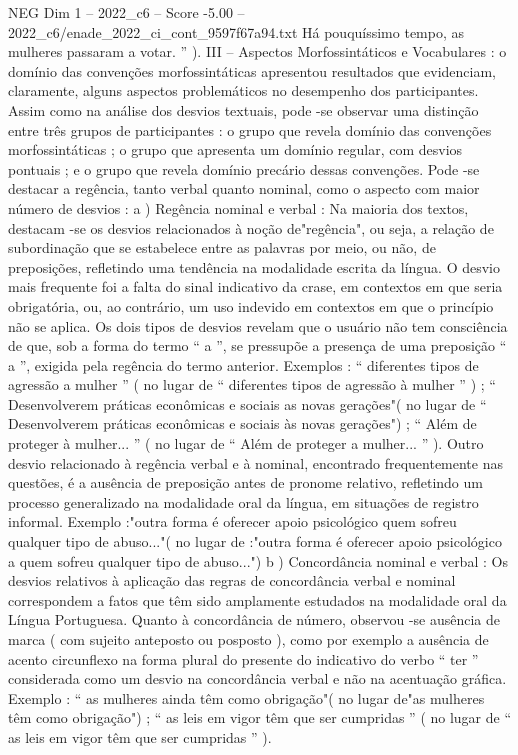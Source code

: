 \begin{textsample}{NEG Dim 1 – 2022\_c6 – Score -5.00 – 2022\_c6/enade\_2022\_ci\_cont\_9597f67a94.txt}
Há pouquíssimo tempo, as mulheres passaram a votar. ” ).
III – Aspectos Morfossintáticos e Vocabulares : o domínio das convenções morfossintáticas apresentou resultados que evidenciam, claramente, alguns aspectos problemáticos no desempenho dos participantes.
Assim como na análise dos desvios textuais, pode -se observar uma distinção entre três grupos de participantes : o grupo que revela domínio das convenções morfossintáticas ; o grupo que apresenta um domínio regular, com desvios pontuais ; e o grupo que revela domínio precário dessas convenções.
Pode -se destacar a regência, tanto verbal quanto nominal, como o aspecto com maior número de desvios : a ) Regência nominal e verbal : Na maioria dos textos, destacam -se os desvios relacionados à noção de"regência", ou seja, a relação de subordinação que se estabelece entre as palavras por meio, ou não, de preposições, refletindo uma tendência na modalidade escrita da língua.
O desvio mais frequente foi a falta do sinal indicativo da crase, em contextos em que seria obrigatória, ou, ao contrário, um uso indevido em contextos em que o princípio não se aplica.
Os dois tipos de desvios revelam que o usuário não tem consciência de que, sob a forma do termo “ a ”, se pressupõe a presença de uma preposição “ a ”, exigida pela regência do termo anterior.
Exemplos : “ diferentes tipos de agressão a mulher ” ( no lugar de “ diferentes tipos de agressão à mulher ” ) ; “ Desenvolverem práticas econômicas e sociais as novas gerações"( no lugar de “ Desenvolverem práticas econômicas e sociais às novas gerações") ; “ Além de proteger à mulher... ” ( no lugar de “ Além de proteger a mulher... ” ).
Outro desvio relacionado à regência verbal e à nominal, encontrado frequentemente nas questões, é a ausência de preposição antes de pronome relativo, refletindo um processo generalizado na modalidade oral da língua, em situações de registro informal.
Exemplo :"outra forma é oferecer apoio psicológico quem sofreu qualquer tipo de abuso..."( no lugar de :"outra forma é oferecer apoio psicológico a quem sofreu qualquer tipo de abuso...") b ) Concordância nominal e verbal : Os desvios relativos à aplicação das regras de concordância verbal e nominal correspondem a fatos que têm sido amplamente estudados na modalidade oral da Língua Portuguesa.
Quanto à concordância de número, observou -se ausência de marca ( com sujeito anteposto ou posposto ), como por exemplo a ausência de acento circunflexo na forma plural do presente do indicativo do verbo “ ter ” considerada como um desvio na concordância verbal e não na acentuação gráfica.
Exemplo : “ as mulheres ainda têm como obrigação"( no lugar de"as mulheres têm como obrigação") ; “ as leis em vigor têm que ser cumpridas ” ( no lugar de “ as leis em vigor têm que ser cumpridas ” ).

\end{textsample}
